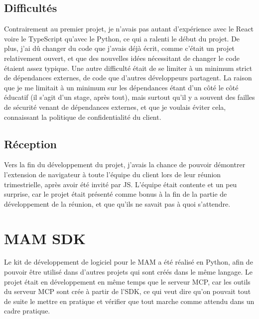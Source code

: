 \subsection*{Difficultés}

\begin{flushleft}
  Contrairement au premier projet, je n'avais pas autant d'expérience
  avec le React voire le TypeScript qu'avec le Python, ce qui a ralenti
  le début du projet. De plus, j'ai dû changer du code que j'avais déjà
  écrit, comme c'était un projet relativement ouvert, et que des nouvelles
  idées nécessitant de changer le code étaient assez typique.
  Une autre difficulté était de se limiter à un minimum strict de dépendances
  externes, \sccad{} de code que d'autres développeurs partagent. La raison
  que je me limitait à un minimum sur les dépendances étant d'un côté le
  côté éducatif (il s'agit d'un stage, après tout), mais surtout qu'il y a
  souvent des failles de sécurité venant de dépendances externes, et que je
  voulais éviter cela, connaissant la politique de confidentialité du client.
\end{flushleft}

\subsection*{Réception}

\begin{flushleft}
  Vers la fin du développement du projet, j'avais la chance de pouvoir
  démontrer l'extension de navigateur à toute l'équipe du client lors
  de leur réunion trimestrielle, après avoir été invité par JS.\@
  L'équipe était contente et un peu surprise, car le projet était présenté
  comme bonus à la fin de la partie de développement de la réunion, et que
  qu'ils ne savait pas à quoi s'attendre.
\end{flushleft}

\section{MAM SDK}

\begin{flushleft}
  Le kit de développement de logiciel pour le MAM a été réalisé en Python,
  afin de pouvoir être utilisé dans d'autres projets qui sont créés dans le
  même langage. Le projet était en développement en même temps que le serveur
  MCP, car les outils du serveur MCP sont crée à partir de l'SDK, ce qui veut
  dire qu'on pouvait tout de suite le mettre en pratique et vérifier que tout
  marche comme attendu dans un cadre pratique.
\end{flushleft}

